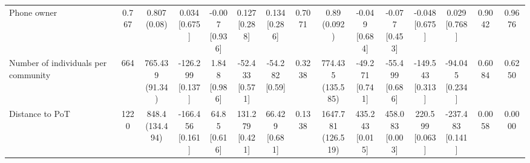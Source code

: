 \documentclass[
]{article}
\begin{document}
\begin{table}
{\begin{tabular}[t]{lcccccccccccccc}
\hspace{1em}Phone owner & 0.767 & \makecell[c]{0.807\\(0.08)} & \makecell[c]{0.034\\{[0.675]}} & \makecell[c]{-0.007\\{[0.936]}} & \makecell[c]{0.127\\{[0.288]}} & \makecell[c]{0.134\\{[0.286]}} & 0.7071 & \makecell[c]{0.89\\(0.092)} & \makecell[c]{-0.049\\{[0.684]}} & \makecell[c]{-0.077\\{[0.453]}} & \makecell[c]{-0.048\\{[0.675]}} & \makecell[c]{0.029\\{[0.768]}} & 0.9042 & 0.9676\\
\hspace{1em}Number of individuals per community & 664 & \makecell[c]{765.439\\(91.34)} & \makecell[c]{-126.299\\{[0.137]}} & \makecell[c]{1.848\\{[0.986]}} & \makecell[c]{-52.433\\{[0.571]}} & \makecell[c]{-54.282\\{[0.59]}} & 0.3238 & \makecell[c]{774.435\\(135.585)} & \makecell[c]{-49.271\\{[0.741]}} & \makecell[c]{-55.499\\{[0.686]}} & \makecell[c]{-149.543\\{[0.313]}} & \makecell[c]{-94.045\\{[0.234]}} & 0.6084 & 0.6250\\
\hspace{1em}Distance to PoT & 1220 & \makecell[c]{848.4\\(134.494)} & \makecell[c]{-166.456\\{[0.161]}} & \makecell[c]{64.85\\{[0.616]}} & \makecell[c]{131.279\\{[0.421]}} & \makecell[c]{66.429\\{[0.681]}} & 0.1338 & \makecell[c]{1647.781\\(126.519)} & \makecell[c]{435.243\\{[0.015]}} & \makecell[c]{458.083\\{[0.003]}} & \makecell[c]{220.599\\{[0.063]}} & \makecell[c]{-237.483\\{[0.141]}} & 0.0058 & 0.0000\\

\end{tabular}}
\end{table}
\end{document}

